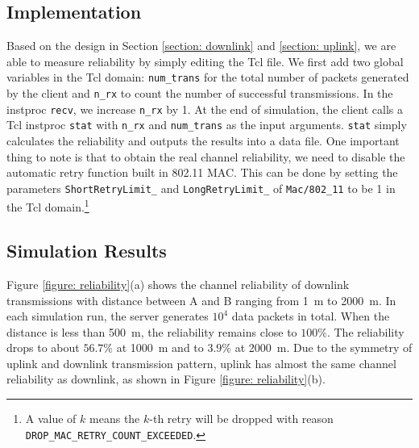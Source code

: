 \documentclass{article}
\begin{document}
\subsection{Implementation}
Based on the design in Section \ref{section: downlink} and \ref{section: uplink}, we are able to measure reliability by simply editing the Tcl file. We first add two global variables in the Tcl domain: \lstinline|num_trans| for the total number of packets generated by the client and \lstinline|n_rx| to count the number of successful transmissions. In the instproc \lstinline|recv|, we increase \lstinline|n_rx| by 1. At the end of simulation, the client calls a Tcl instproc \lstinline|stat| with \lstinline|n_rx| and \lstinline|num_trans| as the input arguments. \lstinline|stat| simply calculates the reliability and outputs the results into a data file. One important thing to note is that to obtain the real channel reliability, we need to disable the automatic retry function built in 802.11 MAC. This can be done by setting the parameters \lstinline|ShortRetryLimit_| and \lstinline|LongRetryLimit_| of \lstinline|Mac/802_11| to be 1 in the Tcl domain.\footnote{A value of $k$ means the $k$-th retry will be dropped with reason \lstinline|DROP_MAC_RETRY_COUNT_EXCEEDED|.}

\subsection{Simulation Results}
Figure \ref{figure: reliability}(a) shows the channel reliability of downlink transmissions with distance between A and B ranging from \SI{1}{m} to \SI{2000}{m}. In each simulation run, the server generates $10^4$ data packets in total. When the distance is less than \SI{500}{m}, the reliability remains close to $100\%$. The reliability drops to about $56.7\%$ at \SI{1000}{m} and to $3.9\%$ at \SI{2000}{m}. Due to the symmetry of uplink and downlink transmission pattern, uplink has almost the same channel reliability as downlink, as shown in Figure \ref{figure: reliability}(b).
\end{document}
